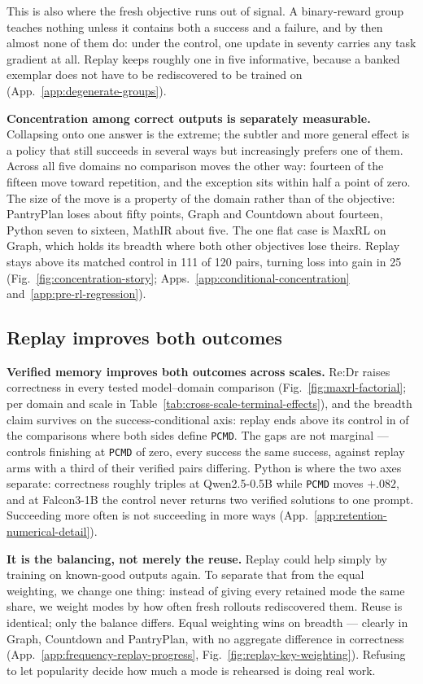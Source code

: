 \documentclass{article}
\newcommand{\1}{\mathbf 1}
\newcommand{\pmd}{\texttt{PCMD}}
\theoremstyle{remark}
\theoremstyle{definition}
\theoremstyle{plain}
\begin{document}
This is also where the fresh objective runs out of signal. A binary-reward group
teaches nothing unless it contains both a success and a failure, and by then
almost none of them do: under the control, one update in seventy carries any
task gradient at all. Replay keeps roughly one in five informative, because a
banked exemplar does not have to be rediscovered to be trained on
(App.~\ref{app:degenerate-groups}).

\textbf{Concentration among correct outputs is separately measurable.}
Collapsing onto one answer is the extreme; the subtler and more general effect
is a policy that still succeeds in several ways but increasingly prefers one of
them. Across all five domains no comparison moves the other way: fourteen of the
fifteen move toward repetition, and the exception sits within half a point of
zero. The size of the move is a property of the domain rather than of the
objective: PantryPlan loses about fifty points, Graph and Countdown about
fourteen, Python seven to sixteen, MathIR about five. The one flat case is
MaxRL on Graph, which holds its breadth where both other objectives lose
theirs.
Replay stays above its matched control in 111 of 120 pairs, turning loss into
gain in 25
(Fig.~\ref{fig:concentration-story}; Apps.~\ref{app:conditional-concentration}
and~\ref{app:pre-rl-regression}).


\subsection{Replay improves both outcomes}
\label{sec:results-retention}

\textbf{Verified memory improves both outcomes across scales.}
Re:Dr raises correctness in every tested model--domain comparison
(Fig.~\ref{fig:maxrl-factorial}; per domain and scale in
Table~\ref{tab:cross-scale-terminal-effects}), and the breadth claim survives
on the success-conditional axis: replay ends above its control in \PMDabove{}
of the \PMDblocks{} comparisons where both sides define \pmd{}. The gaps are
not marginal --- controls finishing at \pmd{} of zero, every success the same
success, against replay arms with a third of their verified pairs differing.
Python is where the two axes separate: correctness roughly triples at
Qwen2.5-0.5B while \pmd{} moves $+.082$, and at Falcon3-1B the control never
returns two verified solutions to one prompt.
Succeeding more often is not succeeding in more ways
(App.~\ref{app:retention-numerical-detail}).

\textbf{It is the balancing, not merely the reuse.}
Replay could help simply by training on known-good outputs again. To separate
that from the equal weighting, we change one thing: instead of giving every
retained mode the same share, we weight modes by how often fresh rollouts
rediscovered them. Reuse is identical; only the balance differs. Equal
weighting wins on breadth --- clearly in Graph, Countdown and PantryPlan, with
no aggregate difference in correctness
(App.~\ref{app:frequency-replay-progress},
Fig.~\ref{fig:replay-key-weighting}). Refusing to let popularity decide how
much a mode is rehearsed is doing real work.
\end{document}
